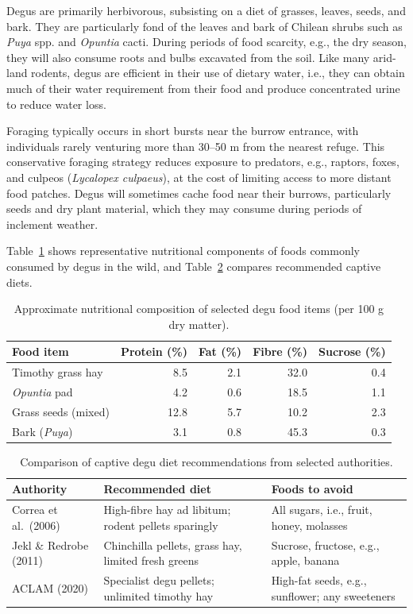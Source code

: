 \documentclass[12pt,a4paper]{article}
\begin{document}
Degus are primarily herbivorous, subsisting on a diet of grasses, leaves, seeds, and bark.
They are particularly fond of the leaves and bark of Chilean shrubs such as \textit{Puya} spp.
and \textit{Opuntia} cacti.
During periods of food scarcity, e.g., the dry season, they will also consume roots and bulbs excavated from the soil.
Like many arid-land rodents, degus are efficient in their use of dietary water, i.e., they can obtain much of their water requirement from their food and produce concentrated urine to reduce water loss.

Foraging typically occurs in short bursts near the burrow entrance, with individuals rarely venturing more than 30--50 m from the nearest refuge.
This conservative foraging strategy reduces exposure to predators, e.g., raptors, foxes, and culpeos (\textit{Lycalopex culpaeus}), at the cost of limiting access to more distant food patches.
Degus will sometimes cache food near their burrows, particularly seeds and dry plant material, which they may consume during periods of inclement weather.

Table~\ref{tab:diet} shows representative nutritional components of foods commonly consumed by degus in the wild, and Table~\ref{tab:lab_diet} compares recommended captive diets.

\begin{table}[ht]
\centering
\caption{Approximate nutritional composition of selected degu food items (per 100 g dry matter).}
\label{tab:diet}
\begin{tabular}{lrrrr}
\toprule
\textbf{Food item} & \textbf{Protein (\%)} & \textbf{Fat (\%)} & \textbf{Fibre (\%)} & \textbf{Sucrose (\%)} \\
\midrule
Timothy grass hay    & 8.5  & 2.1  & 32.0 & 0.4 \\
\textit{Opuntia} pad & 4.2  & 0.6  & 18.5 & 1.1 \\
Grass seeds (mixed)  & 12.8 & 5.7  & 10.2 & 2.3 \\
Bark (\textit{Puya}) & 3.1  & 0.8  & 45.3 & 0.3 \\
\bottomrule
\end{tabular}
\end{table}

\begin{table}[ht]
\centering
\caption{Comparison of captive degu diet recommendations from selected authorities.}
\label{tab:lab_diet}
\begin{tabular}{p{4cm}p{4.5cm}p{4.5cm}}
\toprule
\textbf{Authority} & \textbf{Recommended diet} & \textbf{Foods to avoid} \\
\midrule
Correa et al.\ (2006) & High-fibre hay ad libitum; rodent pellets sparingly & All sugars, i.e., fruit, honey, molasses \\
Jekl \& Redrobe (2011) & Chinchilla pellets, grass hay, limited fresh greens & Sucrose, fructose, e.g., apple, banana \\
ACLAM (2020) & Specialist degu pellets; unlimited timothy hay & High-fat seeds, e.g., sunflower; any sweeteners \\
\bottomrule
\end{tabular}
\end{table}
\end{document}

